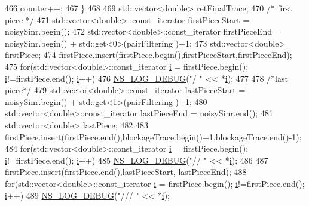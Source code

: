\begin{DoxyCode}
466                 counter++;
467         \}
468 
469          std::vector<double> retFinalTrace;
470          \textcolor{comment}{/* first piece */}
471          std::vector<double>::const\_iterator firstPieceStart = noisySinr.begin();
472          std::vector<double>::const\_iterator firstPieceEnd = noisySinr.begin() +  std::get<0>(pairFiltering
      )+1;
473          std::vector<double> firstPiece;
474          firstPiece.insert(firstPiece.begin(),firstPieceStart,firstPieceEnd);
475          \textcolor{keywordflow}{for}(std::vector<double>::const\_iterator \hyperlink{bernuolliDistribution_8m_a6f6ccfcf58b31cb6412107d9d5281426}{i} = firstPiece.begin(); \hyperlink{bernuolliDistribution_8m_a6f6ccfcf58b31cb6412107d9d5281426}{i}!=firstPiece.end(); 
      \hyperlink{bernuolliDistribution_8m_a6f6ccfcf58b31cb6412107d9d5281426}{i}++)
476                 \hyperlink{group__logging_ga413f1886406d49f59a6a0a89b77b4d0a}{NS\_LOG\_DEBUG}(\textcolor{stringliteral}{"/ "} << *\hyperlink{bernuolliDistribution_8m_a6f6ccfcf58b31cb6412107d9d5281426}{i});
477 
478          \textcolor{comment}{/*last piece*/}
479          std::vector<double>::const\_iterator lastPieceStart = noisySinr.begin() + std::get<1>(pairFiltering
      )+1;
480          std::vector<double>::const\_iterator lastPieceEnd = noisySinr.end();
481          std::vector<double> lastPiece;
482 
483          firstPiece.insert(firstPiece.end(),blockageTrace.begin()+1,blockageTrace.end()-1);
484          \textcolor{keywordflow}{for}(std::vector<double>::const\_iterator \hyperlink{bernuolliDistribution_8m_a6f6ccfcf58b31cb6412107d9d5281426}{i} = firstPiece.begin(); \hyperlink{bernuolliDistribution_8m_a6f6ccfcf58b31cb6412107d9d5281426}{i}!=firstPiece.end(); 
      \hyperlink{bernuolliDistribution_8m_a6f6ccfcf58b31cb6412107d9d5281426}{i}++)
485                 \hyperlink{group__logging_ga413f1886406d49f59a6a0a89b77b4d0a}{NS\_LOG\_DEBUG}(\textcolor{stringliteral}{"// "} << *\hyperlink{bernuolliDistribution_8m_a6f6ccfcf58b31cb6412107d9d5281426}{i});
486 
487          firstPiece.insert(firstPiece.end(),lastPieceStart, lastPieceEnd);
488          \textcolor{keywordflow}{for}(std::vector<double>::const\_iterator \hyperlink{bernuolliDistribution_8m_a6f6ccfcf58b31cb6412107d9d5281426}{i} = firstPiece.begin(); \hyperlink{bernuolliDistribution_8m_a6f6ccfcf58b31cb6412107d9d5281426}{i}!=firstPiece.end(); 
      \hyperlink{bernuolliDistribution_8m_a6f6ccfcf58b31cb6412107d9d5281426}{i}++)
489          \hyperlink{group__logging_ga413f1886406d49f59a6a0a89b77b4d0a}{NS\_LOG\_DEBUG}(\textcolor{stringliteral}{"/// "} << *\hyperlink{bernuolliDistribution_8m_a6f6ccfcf58b31cb6412107d9d5281426}{i});

\end{DoxyCode}
